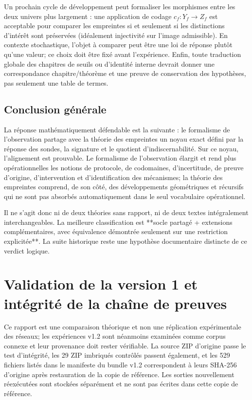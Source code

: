\documentclass[11pt,a4paper,oneside]{report}
\begin{document}
Un prochain cycle de développement peut formaliser les morphismes entre les deux univers plus largement : une application de codage \(c_f:Y_f\to Z_f\) est acceptable pour comparer les empreintes si et seulement si les distinctions d'intérêt sont préservées (idéalement injectivité sur l'image admissible). En contexte stochastique, l'objet à comparer peut être une loi de réponse plutôt qu'une valeur; ce choix doit être fixé avant l'expérience. Enfin, toute traduction globale des chapitres de seuils ou d'identité interne devrait donner une correspondance chapitre/théorème et une preuve de conservation des hypothèses, pas seulement une table de termes.

\section{Conclusion générale}
La réponse mathématiquement défendable est la suivante : le formalisme de l'observation partage avec la théorie des empreintes un noyau exact défini par la réponse des sondes, la signature et le quotient d'indiscernabilité. Sur ce noyau, l'alignement est prouvable. Le formalisme de l'observation élargit et rend plus opérationnelles les notions de protocole, de codomaines, d'incertitude, de preuve d'origine, d'intervention et d'identification des mécanismes; la théorie des empreintes comprend, de son côté, des développements géométriques et récursifs qui ne sont pas absorbés automatiquement dans le seul vocabulaire opérationnel.

Il ne s'agit donc ni de deux théories sans rapport, ni de deux textes intégralement interchangeables. La meilleure classification est **socle partagé + extensions complémentaires, avec équivalence démontrée seulement sur une restriction explicitée**. La suite historique reste une hypothèse documentaire distincte de ce verdict logique.

\appendix
\chapter{Validation de la version 1 et intégrité de la chaîne de preuves}
Ce rapport est une comparaison théorique et non une réplication expérimentale des réseaux; les expériences v1.2 sont néanmoins examinées comme corpus connexe et leur provenance doit rester vérifiable. La source ZIP d'origine passe le test d'intégrité, les 29 ZIP imbriqués contrôlés passent également, et les 529 fichiers listés dans le manifeste du bundle v1.2 correspondent à leurs SHA-256 d'origine après restauration de la copie de référence. Les sorties nouvellement réexécutées sont stockées séparément et ne sont pas écrites dans cette copie de référence.
\end{document}
